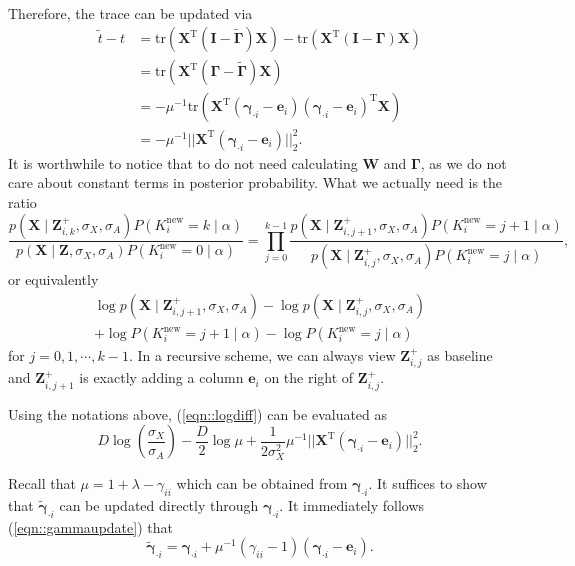 \documentclass{article}
\begin{document}
\begin{appendices}
$$\begin{aligned}
      \label{eqn::gammaupdate}
    \end{aligned}
    $$
    Therefore, the trace can be updated via $$
    \begin{aligned}
      \widetilde{t} - t &= \mathrm{tr}({\mathbf{X}}^{\mathrm{T}}(\mathbf{I} - \widetilde{\mathbf{\Gamma}})\mathbf{X}) - \mathrm{tr}({\mathbf{X}}^{\mathrm{T}}(\mathbf{I} - \mathbf{\Gamma})\mathbf{X}) \\
      &= \mathrm{tr}({\mathbf{X}}^{\mathrm{T}}(\mathbf{\Gamma} - \widetilde{\mathbf{\Gamma}})\mathbf{X}) \\
      &= -\mu^{-1}\mathrm{tr}({\mathbf{X}}^{\mathrm{T}}(\boldsymbol{\gamma}_{\cdot i} - \boldsymbol{e}_i)(\boldsymbol{\gamma}_{\cdot i} - \boldsymbol{e}_i)^\mathrm{T}\mathbf{X}) \\
      &= -\mu^{-1}||{\mathbf{X}}^{\mathrm{T}}(\boldsymbol{\gamma}_{\cdot i} - \boldsymbol{e}_i)||_2^2.
    \end{aligned}
    $$
    It is worthwhile to notice that to do not need calculating $\mathbf{W}$ and $\mathbf{\Gamma}$, as we do not care about constant terms in posterior probability. What we actually need is the ratio $$\frac{p(\mathbf{X}\mid \mathbf{Z}_{i,k}^{+},\sigma_X,\sigma_A)P(K_i^\text{new} = k\mid\alpha)}{p(\mathbf{X}\mid \mathbf{Z},\sigma_X,\sigma_A)P(K_i^\text{new} = 0\mid\alpha)} = \prod_{j = 0}^{k-1} \frac{p(\mathbf{X}\mid \mathbf{Z}_{i,j+1}^{+},\sigma_X,\sigma_A)P(K_i^\text{new} = j+1\mid\alpha)}{p(\mathbf{X}\mid \mathbf{Z}_{i,j}^{+},\sigma_X,\sigma_A)P(K_i^\text{new} = j\mid\alpha)},$$
  or equivalently \begin{multline}\log p(\mathbf{X}\mid \mathbf{Z}_{i,j+1}^{+},\sigma_X,\sigma_A) - \log p(\mathbf{X}\mid \mathbf{Z}_{i,j}^{+},\sigma_X,\sigma_A) \\+ \log P(K_i^\text{new} = j+1\mid\alpha) - \log P(K_i^\text{new} = j\mid\alpha)
  \label{eqn::logdiff}
  \end{multline}
    for $j = 0, 1,\cdots, k-1$.
    In a recursive scheme, we can always view $\mathbf{Z}_{i,j}^+$ as baseline and $\mathbf{Z}_{i, j+1}^+$ is exactly adding a column $\boldsymbol{e}_i$ on the right of $\mathbf{Z}_{i,j}^+$.

    Using the notations above, (\ref{eqn::logdiff}) can be evaluated as $$D\log \left(\frac{\sigma_X}{\sigma_A}\right) - \frac{D}{2}\log \mu + \frac{1}{2\sigma_X^2}\mu^{-1}||{\mathbf{X}}^{\mathrm{T}}(\boldsymbol{\gamma}_{\cdot i} - \boldsymbol{e}_i)||_2^2.$$

    Recall that $\mu = 1 + \lambda - \gamma_{ii}$ which can be obtained from $\boldsymbol{\gamma}_{\cdot i}$. It suffices to show that $\widetilde{\boldsymbol{\gamma}}_{\cdot i}$ can be updated directly through $\boldsymbol{\gamma}_{\cdot i}$.
    It immediately follows (\ref{eqn::gammaupdate}) that $$\widetilde{\boldsymbol{\gamma}}_{\cdot i} = \boldsymbol{\gamma}_{\cdot i} + \mu^{-1}(\gamma_{ii} - 1)(\boldsymbol{\gamma}_{\cdot i} - \boldsymbol{e}_i).$$
\end{appendices}
\end{document}
